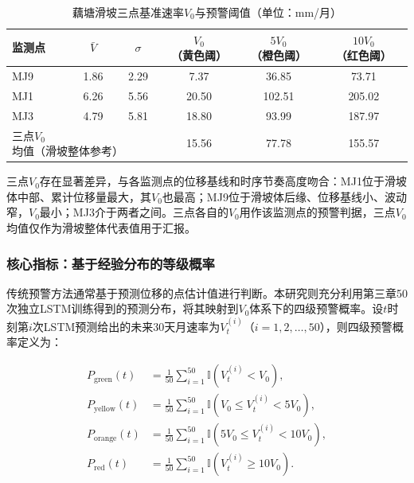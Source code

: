 \documentclass[12pt,a4paper]{article}
\newcommand{\tabcaption}[2]{%
  \caption[#1]{{\CJKfamily{songbold}#1}}}
\begin{document}
\begin{table}[htbp]
\centering
\tabcaption{藕塘滑坡三点基准速率$V_0$与预警阈值（单位：mm/月）}{Reference Velocity $V_0$ and Warning Thresholds at Three Monitoring Points (Unit: mm/month)}
\label{tab:v0_per_target}
\begin{tabular}{lccccc}
\toprule
监测点 & $\bar V$ & $\sigma$ & $V_0$（黄色阈） & $5V_0$（橙色阈） & $10V_0$（红色阈） \\
\midrule
MJ9 & 1.86 & 2.29 & 7.37  & 36.85  & 73.71  \\
MJ1 & 6.26 & 5.56 & 20.50 & 102.51 & 205.02 \\
MJ3 & 4.79 & 5.81 & 18.80 & 93.99  & 187.97 \\
\midrule
\multicolumn{3}{l}{三点$V_0$均值（滑坡整体参考）} & 15.56 & 77.78 & 155.57 \\
\bottomrule
\end{tabular}
\end{table}

三点$V_0$存在显著差异，与各监测点的位移基线和时序节奏高度吻合：MJ1位于滑坡体中部、累计位移量最大，其$V_0$也最高；MJ9位于滑坡体后缘、位移基线小、波动窄，$V_0$最小；MJ3介于两者之间。三点各自的$V_0$用作该监测点的预警判据，三点$V_0$均值仅作为滑坡整体代表值用于汇报。

\subsubsection{核心指标：基于经验分布的等级概率}

传统预警方法通常基于预测位移的点估计值进行判断。本研究则充分利用第三章50次独立LSTM训练得到的预测分布，将其映射到$V_0$体系下的四级预警概率。设$t$时刻第$i$次LSTM预测给出的未来30天月速率为$V_t^{(i)}$（$i=1,2,\ldots,50$），则四级预警概率定义为：

\begin{equation}
\begin{aligned}
P_{\text{green}}(t)  &= \frac{1}{50}\sum_{i=1}^{50}\mathbb{I}(V_t^{(i)} < V_0), \\
P_{\text{yellow}}(t) &= \frac{1}{50}\sum_{i=1}^{50}\mathbb{I}(V_0 \leq V_t^{(i)} < 5V_0), \\
P_{\text{orange}}(t) &= \frac{1}{50}\sum_{i=1}^{50}\mathbb{I}(5V_0 \leq V_t^{(i)} < 10V_0), \\
P_{\text{red}}(t)    &= \frac{1}{50}\sum_{i=1}^{50}\mathbb{I}(V_t^{(i)} \geq 10V_0).
\end{aligned}
\label{eq:level-probs}
\end{equation}
\end{document}
